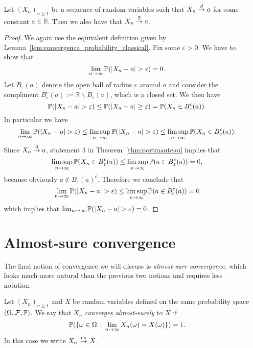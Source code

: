 \begin{lemma}{}\label{lem:dlim_constant_plim}
Let $(X_n)_{n \ge 1}$ be a sequence of random variables such that $X_n \stackrel{d}{\rightarrow} a$ for some constant $a \in \mathbb{R}$. Then we also have that $X_n \stackrel{\mathbb P}{\rightarrow} a$.
\end{lemma}

\begin{proof}
We again use the equivalent definition given by Lemma~\ref{lem:convergence_probability_classical}. Fix some $\varepsilon > 0$. We have to show that
\[
	\lim_{n \to \infty} \bbP(|X_n-a|>\varepsilon) = 0.
\]
Let $B_\varepsilon(a)$ denote the open ball of radius $\varepsilon$ around $a$ and consider the compliment $B_\varepsilon^c(a) := \mathbb{R} \backslash B_\varepsilon(a)$, which is a closed set. We then have
\[
	\bbP(|X_n-a|>\varepsilon) \le \bbP(|X_n-a|\ge\varepsilon) = \bbP(X_n \in B_\varepsilon^c(a)). 
\]
In particular we have
\[
	\lim_{n \to \infty} \bbP(|X_n-a|>\varepsilon) \le \limsup_{n \to \infty} \bbP(|X_n-a|>\varepsilon)
	\le \limsup_{n \to \infty} \bbP(X_n \in B_\varepsilon^c(a)).
\]
Since $X_n \stackrel{d}{\rightarrow} a$, statement 3 in Theorem~\ref{thm:portmanteau} implies that 
\[
	\limsup_{n \to \infty} \mathbb P(X_n \in B_\varepsilon^c(a))
	\le \limsup_{n \to \infty} \mathbb P(a \in B_\varepsilon^c(a)) = 0,
\]
because obviously $a \notin B_\varepsilon(a)^c$. Therefore we conclude that
\[
	\lim_{n \to \infty} \bbP(|X_n-a|>\varepsilon)
	\le \limsup_{n \to \infty} \bbP(a \in B_\varepsilon^c(a)) = 0
\]
which implies that $\lim_{n \to \infty} \bbP(|X_n-a|>\varepsilon) = 0$.
\end{proof}


\section{Almost-sure convergence}\label{ssec:almost_sure_convergence}

The final notion of convergence we will discuss is \emph{almost-sure convergence}, which looks much more natural than the previous two notions and requires less notation.

\begin{definition}\label{def:almost_sure_convergence}
Let $(X_n)_{n \ge 1}$ and $X$ be random variables defined on the same probability space $(\Omega, \mathcal F, \mathbb P)$. We say that $X_n$ \emph{converges almost-surely} to $X$ if
\[
	\mathbb P(\{\omega \in \Omega \, : \, \lim_{n \to \infty} X_n(\omega) = X(\omega)\}) = 1.
\] 
In this case we write $X_n \stackrel{\mathrm{a.s.}}{\rightarrow} X$.
\end{definition} 


